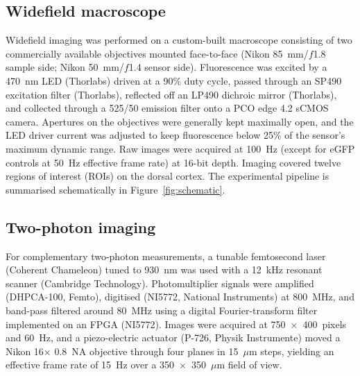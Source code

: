 \documentclass[11pt]{article}
\begin{document}
\subsection{Widefield macroscope}
Widefield imaging was performed on a custom-built macroscope consisting of two commercially available objectives mounted face-to-face (Nikon 85~mm/$f$1.8 sample side; Nikon 50~mm/$f$1.4 sensor side). Fluorescence was excited by a 470~nm LED (Thorlabs) driven at a 90\% duty cycle, passed through an SP490 excitation filter (Thorlabs), reflected off an LP490 dichroic mirror (Thorlabs), and collected through a 525/50 emission filter onto a PCO edge 4.2 sCMOS camera. Apertures on the objectives were generally kept maximally open, and the LED driver current was adjusted to keep fluorescence below 25\% of the sensor's maximum dynamic range. Raw images were acquired at 100~Hz (except for eGFP controls at 50~Hz effective frame rate) at 16-bit depth. Imaging covered twelve regions of interest (ROIs) on the dorsal cortex. The experimental pipeline is summarised schematically in Figure~\ref{fig:schematic}.

\subsection{Two-photon imaging}
For complementary two-photon measurements, a tunable femtosecond laser (Coherent Chameleon) tuned to 930~nm was used with a 12~kHz resonant scanner (Cambridge Technology). Photomultiplier signals were amplified (DHPCA-100, Femto), digitised (NI5772, National Instruments) at 800~MHz, and band-pass filtered around 80~MHz using a digital Fourier-transform filter implemented on an FPGA (NI5772). Images were acquired at 750~$\times$~400~pixels and 60~Hz, and a piezo-electric actuator (P-726, Physik Instrumente) moved a Nikon 16$\times$ 0.8~NA objective through four planes in 15~$\mu$m steps, yielding an effective frame rate of 15~Hz over a 350~$\times$~350~$\mu$m field of view.
\end{document}
